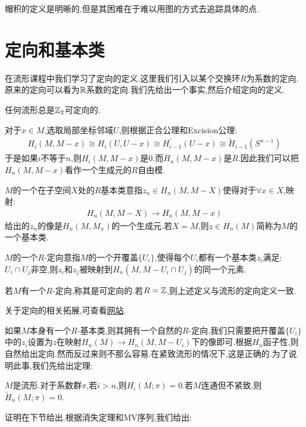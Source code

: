 帽积的定义是明晰的,但是其困难在于难以用图的方式去追踪具体的点.
\section{定向和基本类}
在流形课程中我们学习了定向的定义.这里我们引入以某个交换环$R$为系数的定向.原来的定向可以看为$\mathbb{R}$系数的定向.我们先给出一个事实,然后介绍定向的定义.
\begin{proposition}
任何流形总是$\mathbb{Z}_2$可定向的.
\end{proposition}

对于$x \in M$,选取局部坐标邻域$U$,则根据正合公理和Excision公理:
\begin{align*}
    H_i(M,M-x)\cong H_i(U,U-x) \cong \tilde{H_{i-1}}(U-x) \cong \tilde{H}_{i-1}(S^{n-1})
\end{align*}
于是如果$i$不等于$n$,则$H_i(M,M-x)$是$0$.而$H_n(M,M-x)$是$R$.因此我们可以把$H_n(M,M-x)$看作一个生成元的$R$自由模.

\begin{definition}
    $M$的一个在子空间$X$处的$R$基本类意指$z_n \in H_n(M,M-X)$使得对于$\forall x \in X$,映射:
    \begin{align*}
        H_n(M,M-X)\to H_n(M,M-x)
    \end{align*}
    给出的$z_n$的像是$H_n(M,M_x)$的一个生成元.若$X=M$,则$z \in H_n(M)$简称为$M$的一个基本类.

    $M$的一个$R$-定向意指$M$的一个开覆盖$\{U_i\}$,使得每个$U_i$都有一个基本类$z_i$满足:$U_i \cap U_j$非空,则$z_i$和$z_j$被映射到$H_n(M,M-U_i\cap U_j)$的同一个元素.

    若$M$有一个$R$-定向,称其是可定向的.若$R=\mathbb{Z}$,则上述定义与流形的定向定义一致.
\end{definition}

关于定向的相关拓展,可查看\href{http://www.map.mpim-bonn.mpg.de/Orientation_of_manifolds}{网站}.

如果$M$本身有一个$R$-基本类,则其拥有一个自然的$R$-定向.我们只需要把开覆盖$\{U_i\}$中的$z_i$设置为$z$在映射$H_n(M) \to H_n(M,M-U_i)$下的像即可.根据$H_n$函子性,则自然给出定向.然而反过来则不那么容易.在紧致流形的情况下,这是正确的.为了说明此事,我们先给出定理:
\begin{theorem}[Vanishing]
    $M$是流形.对于系数群$\pi$,若$i>n$,则$H_i(M;\pi)=0$.若$M$连通但不紧致,则$\tilde{H}_n(M;\pi)=0$.
\end{theorem}
证明在下节给出.根据消失定理和MV序列,我们给出:

